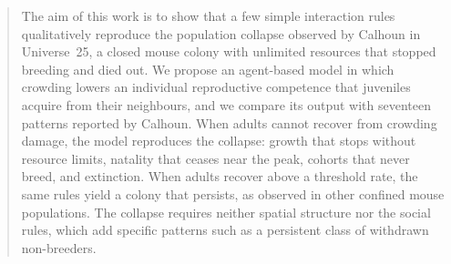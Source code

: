 \begin{abstract}
The aim of this work is to show that a few simple interaction rules qualitatively reproduce the population collapse
observed by Calhoun in Universe~25, a closed mouse colony with unlimited resources that stopped breeding and died
out. We propose an agent-based model in which crowding lowers an individual reproductive competence that juveniles
acquire from their neighbours, and we compare its output with seventeen patterns reported by Calhoun. When adults
cannot recover from crowding damage, the model reproduces the collapse: growth that stops without resource limits,
natality that ceases near the peak, cohorts that never breed, and extinction. When adults recover above a threshold
rate, the same rules yield a colony that persists, as observed in other confined mouse populations. The collapse
requires neither spatial structure nor the social rules, which add specific patterns such as a persistent class of
withdrawn non-breeders.
\end{abstract}
